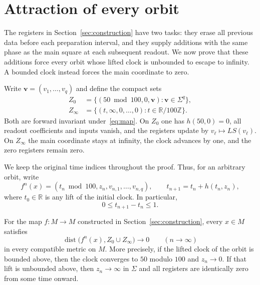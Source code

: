 \section{Attraction of every orbit}\label{sec:orbits}

The registers in Section~\ref{sec:construction} have two tasks: they erase
all previous data before each preparation interval, and they supply additions
with the same phase as the main square at each subsequent readout.  We now
prove that these additions force every orbit whose lifted clock is unbounded
to escape to infinity.  A bounded clock instead forces the main coordinate
to zero.

Write $\mathbf v=(v_1,\ldots,v_q)$ and define the compact sets
\begin{equation}\label{eq:attracting-sets}
\begin{split}
 Z_0&=\{(50\bmod100,0,\mathbf v):\mathbf v\in\Sigma^q\},\\
 Z_\infty&=\{(t,\infty,0,\ldots,0):t\in\mathbb R/100\mathbb Z\}.
\end{split}
\end{equation}
Both are forward invariant under~\eqref{eq:map}.  On $Z_0$ one has
$h(50,0)=0$, all readout coefficients and inputs vanish, and the registers
update by $v_\ell\mapsto LS(v_\ell)$.  On $Z_\infty$ the main coordinate stays at
infinity, the clock advances by one, and the zero registers remain zero.

We keep the original time indices throughout the proof.  Thus, for an
arbitrary orbit, write
\[
 f^n(x)=(t_n\bmod100,z_n,v_{n,1},\ldots,v_{n,q}),\qquad
 t_{n+1}=t_n+h(t_n,z_n),
\]
where $t_0\in\mathbb R$ is any lift of the initial clock.  In particular,
\begin{equation}\label{eq:clock-increments}
 0\le t_{n+1}-t_n\le1.
\end{equation}

\begin{proposition}\label{prop:attraction}
For the map $f:M\to M$ constructed in Section~\ref{sec:construction}, every
$x\in M$ satisfies
\[
 \operatorname{dist}\bigl(f^n(x),Z_0\cup Z_\infty\bigr)\longrightarrow0
 \qquad(n\longrightarrow\infty)
\]
in every compatible metric on $M$.
More precisely, if the lifted clock of the orbit is bounded above, then
the clock converges to $50$ modulo $100$ and $z_n\to0$.
If that lift is unbounded above, then $z_n\to\infty$ in $\Sigma$ and all
registers are identically zero from some time onward.
\end{proposition}

